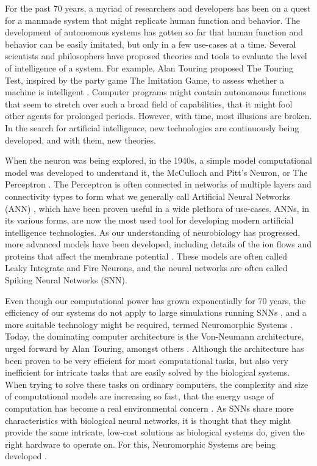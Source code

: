 For the past 70 years, a myriad of researchers and developers has been on a quest for a manmade system that might replicate human function and behavior.
The development of autonomous systems has gotten so far that human function and behavior can be easily imitated, but only in a few use-cases at a time.
Several scientists and philosophers have proposed theories and tools to evaluate the level of intelligence of a system.
For example, Alan Touring proposed The Touring Test, inspired by the party game The Imitation Game, to assess whether a machine is intelligent \cite{computing_machine_intelligence_turing}.
Computer programs might contain autonomous functions that seem to stretch over such a broad field of capabilities,
that it might fool other agents for prolonged periods. However, with time, most illusions are broken.
In the search for artificial intelligence, new technologies are continuously being developed, and with them, new theories.

When the neuron was being explored, in the 1940s, a simple model computational model was developed to understand it, the McCulloch and Pitt's Neuron, or The Perceptron \cite{mculloch_pitts}.
The Perceptron is often connected in networks of multiple layers and connectivity types to form what we generally call Artificial Neural Networks (ANN) \cite{neural_network},
which have been proven useful in a wide plethora of use-cases. ANNs, in its various forms, are now the most used tool for developing modern artificial intelligence technologies.
As our understanding of neurobiology has progressed, more advanced models have been developed, including details of the ion flows and proteins that affect the membrane potential \cite{leaky_integrate_and_fire}.
These models are often called Leaky Integrate and Fire Neurons, and the neural networks are often called Spiking Neural Networks (SNN).

Even though our computational power has grown exponentially for 70 years, the efficiency of our systems do not apply to large simulations running SNNs \cite{moores_law}\cite{hpc_energy},
and a more suitable technology might be required, termed Neuromorphic Systems \cite{neuromorphic_systems}.
Today, the dominating computer architecture is the Von-Neumann architecture, urged forward by Alan Touring, amongst others \cite{imitation_game}.
Although the architecture has been proven to be very efficient for most computational tasks, but also very inefficient for intricate tasks that are easily solved by the biological systems.
When trying to solve these tasks on ordinary computers, the complexity and size of computational models are increasing so fast,
that the energy usage of computation has become a real environmental concern \cite{computation_energy_environment}.
As SNNs share more characteristics with biological neural networks, it is thought that they might provide the same intricate, low-cost solutions as biological systems do,
given the right hardware to operate on. For this, Neuromorphic Systems are being developed \cite{neuromorphic_systems}.

